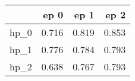 \begin{tabular}{lrrr}
\toprule
{} &   ep 0 &   ep 1 &   ep 2 \\
\midrule
hp\_0 &  0.716 &  0.819 &  0.853 \\
hp\_1 &  0.776 &  0.784 &  0.793 \\
hp\_2 &  0.638 &  0.767 &  0.793 \\
\bottomrule
\end{tabular}
